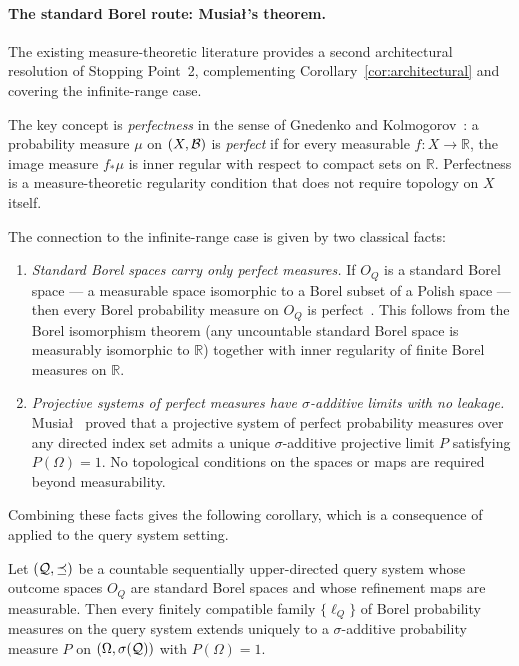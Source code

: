 \paragraph{The standard Borel route: Musia{\l}'s theorem.}
The existing measure-theoretic literature provides a second
architectural resolution of Stopping Point~2, complementing
Corollary~\ref{cor:architectural} and covering the infinite-range
case.

The key concept is \emph{perfectness} in the sense of Gnedenko and
Kolmogorov~\cite{Bogachev2007}: a probability measure $\mu$ on
$(X, \mathcal{B})$ is \emph{perfect} if for every measurable $f: X \to
\mathbb{R}$, the image measure $f_*\mu$ is inner regular with respect
to compact sets on $\mathbb{R}$.  Perfectness is a measure-theoretic
regularity condition that does not require topology on $X$ itself.

The connection to the infinite-range case is given by two classical
facts:
\begin{enumerate}[label=(\roman*)]
\item \emph{Standard Borel spaces carry only perfect measures.}
  If $O_Q$ is a standard Borel space --- a measurable space
  isomorphic to a Borel subset of a Polish space --- then every
  Borel probability measure on $O_Q$ is perfect~\cite{Bogachev2007,
  Fremlin2003}.  This follows from the Borel isomorphism theorem
  (any uncountable standard Borel space is measurably isomorphic
  to $\mathbb{R}$) together with inner regularity of finite Borel
  measures on $\mathbb{R}$.
\item \emph{Projective systems of perfect measures have
  $\sigma$-additive limits with no leakage.}
  Musia{\l}~\cite{Musial1980} proved that a projective system of
  perfect probability measures over any directed index set admits a
  unique $\sigma$-additive projective limit $P$ satisfying
  $P(\Omega) = 1$.  No topological conditions on the spaces or maps
  are required beyond measurability.
\end{enumerate}
Combining these facts gives the following corollary, which is a
consequence of~\cite{Musial1980} applied to the query system setting.

\begin{corollary}
\label{cor:standard-borel}
Let $(\mathcal{Q}, \preceq)$ be a countable sequentially upper-directed
query system whose outcome spaces $O_Q$ are standard Borel spaces
and whose refinement maps are measurable.  Then every finitely
compatible family $\{\ell_Q\}$ of Borel probability measures on
the query system extends uniquely to a $\sigma$-additive probability
measure $P$ on $(\Omega, \sigma(\mathcal{Q}))$ with $P(\Omega) = 1$.
\end{corollary}

